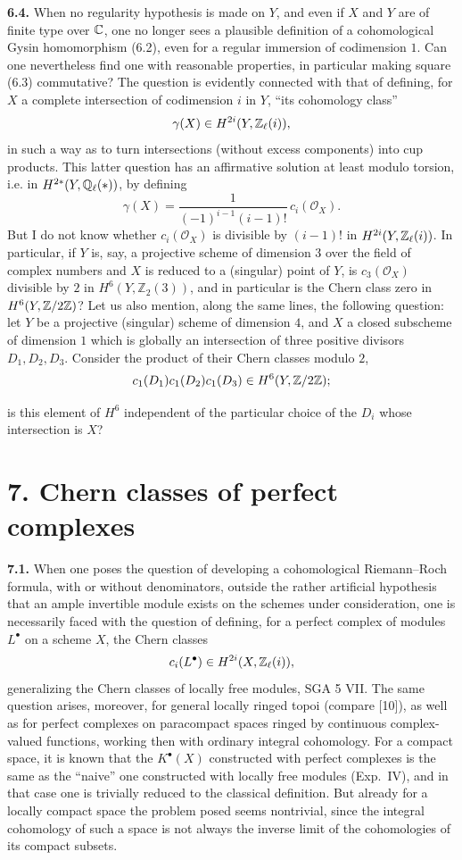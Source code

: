 \noindent\textbf{6.4.}
When no regularity hypothesis is made on $Y$, and even if $X$ and $Y$ are of
finite type over $\mathbb C$, one no longer sees a plausible definition of a
cohomological Gysin homomorphism (6.2), even for a regular immersion of
codimension $1$. Can one nevertheless find one with reasonable properties,
in particular making square (6.3) commutative? The question is evidently
connected with that of defining, for $X$ a complete intersection of
codimension $i$ in $Y$, ``its cohomology class''
\[
 \gamma(X)\in H^{2i}(Y,\mathbb Z_\ell(i)),
\]
in such a way as to turn intersections (without excess components) into cup
products. This latter question has an affirmative solution at least modulo
torsion, i.e. in $H^{2*}(Y,\mathbb Q_\ell(*))$, by defining
\[
 \gamma(X)=\frac{1}{(-1)^{i-1}(i-1)!}\,c_i(\mathcal O_X).
\]
But I do not know whether $c_i(\mathcal O_X)$ is divisible by $(i-1)!$ in
$H^{2i}(Y,\mathbb Z_\ell(i))$. In particular, if $Y$ is, say, a projective scheme of
dimension $3$ over the field of complex numbers and $X$ is reduced to a
(singular) point of $Y$, is $c_3(\mathcal O_X)$ divisible by $2$ in
$H^6(Y,\mathbb Z_2(3))$, and in particular is the Chern class zero in
$H^6(Y,\mathbb Z/2\mathbb Z)$? Let us also mention, along the same lines, the following
question: let $Y$ be a projective (singular) scheme of dimension $4$, and
$X$ a closed subscheme of dimension $1$ which is globally an intersection
of three positive divisors $D_1,D_2,D_3$. Consider the product of their
Chern classes modulo $2$,
\[
 c_1(D_1)c_1(D_2)c_1(D_3)\in H^6(Y,\mathbb Z/2\mathbb Z);
\]

is this element of $H^6$ independent of the particular choice of the $D_i$
whose intersection is $X$?

\section*{7. Chern classes of perfect complexes}

\noindent\textbf{7.1.}
When one poses the question of developing a cohomological Riemann--Roch
formula, with or without denominators, outside the rather artificial
hypothesis that an ample invertible module exists on the schemes under
consideration, one is necessarily faced with the question of defining, for
a perfect complex of modules $L^\bullet$ on a scheme $X$, the Chern classes
\[
 c_i(L^\bullet)\in H^{2i}(X,\mathbb Z_\ell(i)),
\]
generalizing the Chern classes of locally free modules, SGA 5 VII. The same
question arises, moreover, for general locally ringed topoi (compare [10]),
as well as for perfect complexes on paracompact spaces ringed by continuous
complex-valued functions, working then with ordinary integral cohomology.
For a compact space, it is known that the $K^\bullet(X)$ constructed with
perfect complexes is the same as the ``naive'' one constructed with locally
free modules (Exp.~IV), and in that case one is trivially reduced to the
classical definition. But already for a locally compact space the problem
posed seems nontrivial, since the integral cohomology of such a space is not
always the inverse limit of the cohomologies of its compact subsets.

